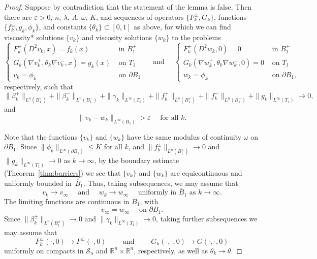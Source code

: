 \documentclass[letter,11pt]{amsart}
\newcommand{\R}{\mathbb{R}}
\newcommand{\vep}{\varepsilon}
\newcommand{\scal}{\mathcal{S}}
\theoremstyle{definition}
\numberwithin{equation}{section}
\begin{document}
\begin{proof}
Suppose by contradiction that the statement of the lemma is false.
Then there are $\vep > 0$, $n$, $\lambda$, $\Lambda$, $\omega$, $K$, and sequences of operators $\{F_k^{\pm}, G_k\}$, functions $\{f_k^{\pm}, g_k, \phi_k\}$, and constants $\{\theta_k\} \subset [0, 1]$ as above, for which we can find viscosity* solutions $\{v_k\}$ and viscosity solutions $\{w_k\}$ to the problems
\[
\begin{cases}
F_k^{\pm}(D^2 v_k, x) = f_k(x) & \text{ in } B_1^{\pm}\\
G_k(\nabla v_k^{+}, \theta_k \nabla v_k^{-}, x) = g_k(x) & \text{ on } T_1\\
v_k = \phi_k & \text{ on } \partial B_1
\end{cases}
\quad \text{ and } \quad 
\begin{cases}
F_{k}^{\pm}(D^2 w_{k}, 0) = 0 & \text{ in } B_{1}^{\pm}\\
G_{k}(\nabla w_{k}^{+}, \theta_k \nabla w_{k}^{-}, 0) = 0
& \text{ on } T_{1}\\
w_{k} = \phi_k & \text{ on } \partial B_1,
\end{cases}
\]
respectively,
such that
\[
\|\beta_k^{+}\|_{L^n(B_1^{+})} + \|\beta_k^{-}\|_{L^n(B_1^{-})}
+ \|\gamma_k\|_{L^{\infty}(T_1)} + \|f_k^{+}\|_{L^{n}(B^{+}_1)} + \|f_k^{-}\|_{L^{n}(B^{-}_1)}+ \|g_k\|_{L^{\infty}(T_1)} \to 0,
\]
and
\[
\|v_k - w_k\|_{L^{\infty}(B_1)} > \vep \quad \text{ for all } k.
\]

\medskip

Note that the functions $\{v_k\}$ and $\{w_k\}$ have the same modulus of continuity $\omega$ on $\partial B_1$.
Since $\|\phi_k\|_{L^{\infty}(\partial B_1)} \leq K$ for all $k$, and $\|f_k^{\pm}\|_{L^n(B_1^{\pm})} \to 0$ and $\|g_k\|_{L^{\infty}(T_1)} \to 0$ as $k \to \infty$, by the boundary estimate (Theorem~\ref{thm:barriers}) we see that $\{v_k\}$ and $\{w_k\}$ are equicontinuous and uniformly bounded in~$\overline{B}_1$.
Thus, taking subsequences, we may assume that 
\[
v_k \to v_{\infty} \quad \text{ and } \quad w_k \to w_{\infty} \quad \text{ uniformly in } \overline{B}_{1}  \text{ as } k \to \infty.
\]
The limiting functions are continuous in $\overline{B}_{1}$, with
\[
v_{\infty} = w_{\infty} \quad \text{ on } \partial B_1.
\]
Since $\|\beta_k^{\pm}\|_{L^n(B_1^{\pm})} \to 0$ and  $\|\gamma_k\|_{L^{\infty}(T_1)} \to 0$, taking further subsequences we may assume that
\[
F_k^{\pm}(\cdot, 0) \to F^{\pm}(\cdot, 0) \qquad \text{ and } \qquad G_k(\cdot, \cdot, 0) \to G(\cdot, \cdot, 0)
\]
uniformly on compacts in $\scal_n$ and $\R^n \times \R^n$, respectively, as well as $\theta_k \to \theta$.


\end{proof}
\end{document}
